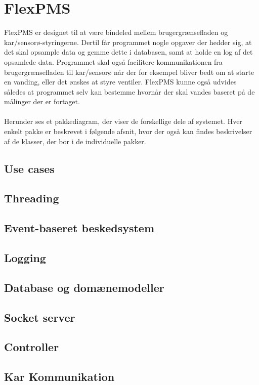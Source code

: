 \section{FlexPMS}
FlexPMS er designet til at være bindeled mellem brugergrænsefladen og kar/sensorø-styringerne. Dertil får programmet nogle opgaver der hedder sig, at det skal opsample data og gemme dette i databasen, samt at holde en log af det opsamlede data. Programmet skal også facilitere kommunikationen fra brugergrænsefladen til kar/sensorø når der for eksempel bliver bedt om at starte en vanding, eller det ønskes at styre ventiler. FlexPMS kunne også udvides således at programmet selv kan bestemme hvornår der skal vandes baseret på de målinger der er fortaget.\\\\

Herunder ses et pakkediagram, der viser de forskellige dele af systemet. Hver enkelt pakke er beskrevet i følgende afsnit, hvor der også kan findes beskrivelser af de klasser, der bor i de individuelle pakker.


\subsection{Use cases}


\subsection{Threading}


\subsection{Event-baseret beskedsystem}


\subsection{Logging}


\subsection{Database og domænemodeller}


\subsection{Socket server}


\subsection{Controller}


\subsection{Kar Kommunikation}

